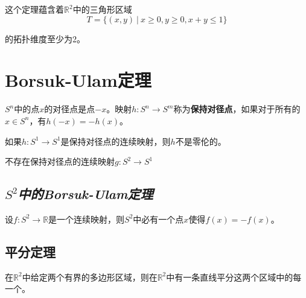 这个定理蕴含着$\mathbb{R}^2$中的三角形区域
\begin{equation}
    T=\{(x,y)\ |\ x\geqslant 0,y\geqslant 0,x+y\leqslant 1\}
\end{equation}

的拓扑维度至少为2。

\section{Borsuk-Ulam定理}

\begin{define}
    $S^n$中的点$x$的对径点是点$-x$。映射$h:S^n\rightarrow S^m$称为\textbf{保持对径点}，如果对于所有的$x\in S^n$，有$h(-x)=-h(x)$。
\end{define}

\vspace*{1em}

\begin{mdframed}
    \begin{theorem}
        如果$h:S^1\rightarrow S^1$是保持对径点的连续映射，则$h$不是零伦的。
    \end{theorem}
\end{mdframed}

\begin{mdframed}
    \begin{theorem}
        不存在保持对径点的连续映射$g:S^2\rightarrow S^1$
    \end{theorem}
\end{mdframed}

\subsection*{$S^2$\textsl{中的Borsuk-Ulam定理}}

\begin{mdframed}
    \begin{theorem}
        设$f:S^2\rightarrow \mathbb{R}$是一个连续映射，则$S^2$中必有一个点$x$使得$f(x)=-f(x)$。
    \end{theorem}
\end{mdframed}

\subsection*{平分定理}

\begin{mdframed}
    \begin{theorem}
        在$\mathbb{R}^2$中给定两个有界的多边形区域，则在$\mathbb{R}^2$中有一条直线平分这两个区域中的每一个。
    \end{theorem}
\end{mdframed}

